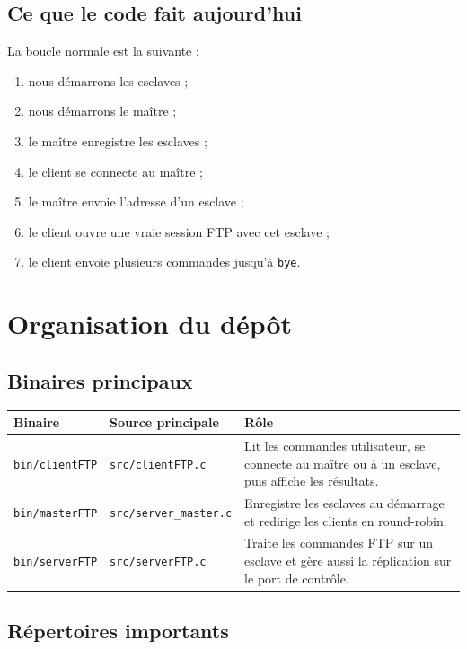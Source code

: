 \documentclass[a4paper,11pt]{article}
\begin{document}
\subsection{Ce que le code fait aujourd'hui}

La boucle normale est la suivante :

\begin{enumerate}[leftmargin=*]
    \item nous démarrons les esclaves ;
    \item nous démarrons le maître ;
    \item le maître enregistre les esclaves ;
    \item le client se connecte au maître ;
    \item le maître envoie l'adresse d'un esclave ;
    \item le client ouvre une vraie session FTP avec cet esclave ;
    \item le client envoie plusieurs commandes jusqu'à \texttt{bye}.
\end{enumerate}
\newpage
\section{Organisation du dépôt}

\subsection{Binaires principaux}

\begin{center}
\small
\begin{tabularx}{\textwidth}{@{}L{0.20\textwidth}L{0.20\textwidth}L{0.52\textwidth}@{}}
\toprule
\textbf{Binaire} & \textbf{Source principale} & \textbf{Rôle} \\
\midrule
\texttt{bin/clientFTP} & \texttt{src/clientFTP.c} & Lit les commandes utilisateur, se connecte au maître ou à un esclave, puis affiche les résultats. \\
\texttt{bin/masterFTP} & \texttt{src/server\_master.c} & Enregistre les esclaves au démarrage et redirige les clients en round-robin. \\
\texttt{bin/serverFTP} & \texttt{src/serverFTP.c} & Traite les commandes FTP sur un esclave et gère aussi la réplication sur le port de contrôle. \\
\bottomrule
\end{tabularx}
\end{center}

\subsection{Répertoires importants}
\end{document}
